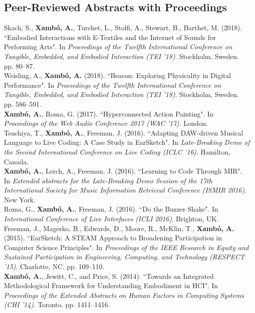 \documentclass[10pt, a4paper]{article}
\newcommand{\years}[1]{\marginnote{\scriptsize #1}}
\begin{document}
\subsection*{Peer-Reviewed Abstracts with Proceedings}
\noindent
\years{2018b}Skach, S., \textbf{Xambó, A.}, Turchet, L., Stolfi, A., Stewart, B., Barthet, M. (2018). “Embodied Interactions with E-Textiles and the Internet of Sounds for Performing Arts". In \emph{Proceedings of the Twelfth International Conference on Tangible, Embedded, and Embodied Interaction (TEI '18)}. Stockholm, Sweden. pp. 80--87.\\
\years{2018a}Weisling, A., \textbf{Xambó, A.} (2018). “Beacon: Exploring Physicality in Digital Performance". In \emph{Proceedings of the Twelfth International Conference on Tangible, Embedded, and Embodied Interaction (TEI '18)}. Stockholm, Sweden. pp. 586--591.\\
\years{2017a}\textbf{Xambó, A.}, Roma, G. (2017). “Hyperconnected Action Painting". In \emph{Proceedings of the Web Audio Conference 2017 (WAC '17)}. London.\\
\years{2016c}Tsuchiya, T., \textbf{Xambó, A.}, Freeman, J. (2016). “Adapting DAW-driven Musical Language to Live Coding: A Case Study in EarSketch". In \emph{Late-Breaking Demo of the Second International Conference on Live Coding (ICLC '16)}. Hamilton, Canada.\\ 
\years{2016b}\textbf{Xambó, A.}, Lerch, A., Freeman, J. (2016). “Learning to Code Through MIR". In \emph{Extended abstracts for the Late-Breaking Demo Session of the 17th International Society for Music Information Retrieval Conference (ISMIR 2016)}. New York.\\
\years{2016a}Roma, G., \textbf{Xambó, A.}, Freeman, J. (2016). “Do the Buzzer Shake". In \emph{International Conference of Live Interfaces (ICLI 2016)}. Brighton, UK.\\
\years{2015}Freeman, J., Magerko, B., Edwards, D., Moore, R., McKlin, T., \textbf{Xambó, A.} (2015). “EarSketch: A STEAM Approach to Broadening Participation in Computer Science Principles". In \emph{Proceedings of the IEEE Research in Equity and Sustained Participation in Engineering, Computing, and Technology (RESPECT '15)}. Charlotte, NC. pp. 109--110.\\
\years{2014}\textbf{Xambó, A.}, Jewitt, C., and Price, S. (2014). “Towards an Integrated Methodological Framework for Understanding Embodiment in HCI". In \emph{Proceedings of the Extended Abstracts on Human Factors in Computing Systems (CHI '14)}. Toronto. pp. 1411--1416.
\end{document}
